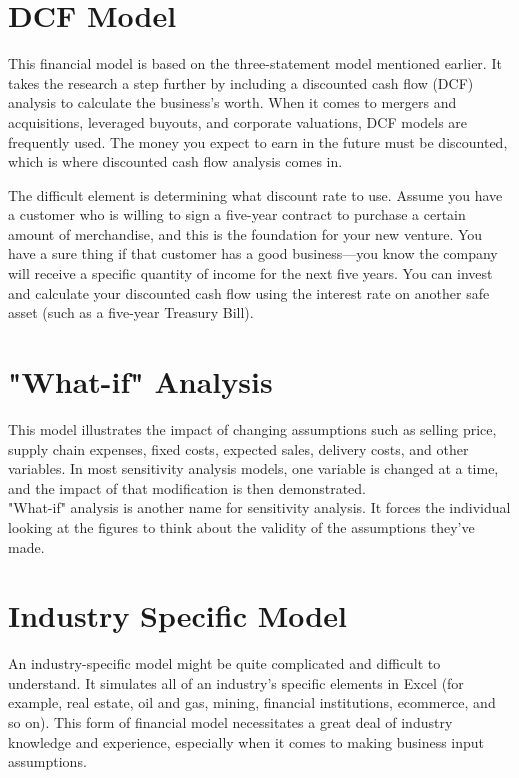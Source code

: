 \documentclass{article}
\begin{document}
\section{DCF Model}
This financial model is based on the three-statement model mentioned earlier. It takes the research a step further by including a discounted cash flow (DCF) analysis to calculate the business's worth. When it comes to mergers and acquisitions, leveraged buyouts, and corporate valuations, DCF models are frequently used.
The money you expect to earn in the future must be discounted, which is where discounted cash flow analysis comes in.

The difficult element is determining what discount rate to use. Assume you have a customer who is willing to sign a five-year contract to purchase a certain amount of merchandise, and this is the foundation for your new venture. You have a sure thing if that customer has a good business—you know the company will receive a specific quantity of income for the next five years. You can invest and calculate your discounted cash flow using the interest rate on another safe asset (such as a five-year Treasury Bill).

\section{"What-if" Analysis}
This model illustrates the impact of changing assumptions such as selling price, supply chain expenses, fixed costs, expected sales, delivery costs, and other variables. In most sensitivity analysis models, one variable is changed at a time, and the impact of that modification is then demonstrated.
\\
"What-if" analysis is another name for sensitivity analysis. It forces the individual looking at the figures to think about the validity of the assumptions they've made.

\section{Industry Specific Model}
An industry-specific model might be quite complicated and difficult to understand. It simulates all of an industry's specific elements in Excel (for example, real estate, oil and gas, mining, financial institutions, ecommerce, and so on). This form of financial model necessitates a great deal of industry knowledge and experience, especially when it comes to making business input assumptions.
\end{document}
